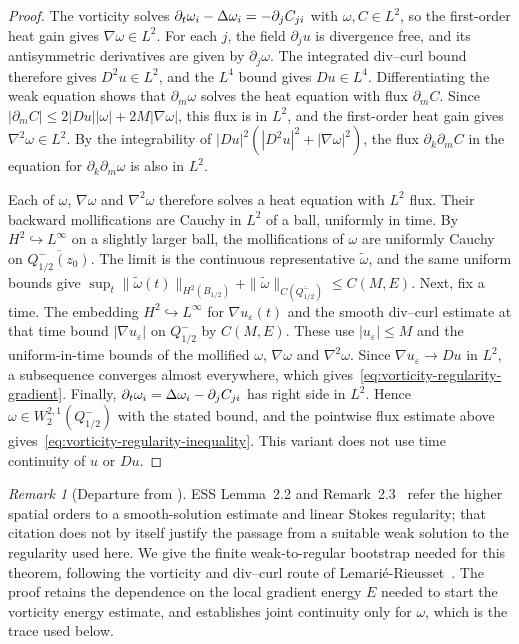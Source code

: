 \documentclass[11pt,letterpaper]{article}
\numberwithin{equation}{section}
\theoremstyle{plain}
\theoremstyle{definition}
\theoremstyle{remark}
\newtheorem{remark}[theorem]{Remark}
\begin{document}
\begin{proof}
The vorticity solves $\partial_t\omega_i-\Delta\omega_i=-\partial_jC_{ji}$ with $\omega,C\in L^2$, so the first-order heat gain gives $\nabla\omega\in L^2$. For each $j$, the field $\partial_ju$ is divergence free, and its antisymmetric derivatives are given by $\partial_j\omega$. The integrated div--curl bound therefore gives $D^2u\in L^2$, and the $L^4$ bound gives $Du\in L^4$. Differentiating the weak equation shows that $\partial_m\omega$ solves the heat equation with flux $\partial_mC$. Since $|\partial_mC|\le2|Du||\omega|+2M|\nabla\omega|$, this flux is in $L^2$, and the first-order heat gain gives $\nabla^2\omega\in L^2$. By the integrability of $|Du|^2(|D^2u|^2+|\nabla\omega|^2)$, the flux $\partial_k\partial_mC$ in the equation for $\partial_k\partial_m\omega$ is also in $L^2$.

Each of $\omega$, $\nabla\omega$ and $\nabla^2\omega$ therefore solves a heat equation with $L^2$ flux. Their backward mollifications are Cauchy in $L^2$ of a ball, uniformly in time. By $H^2\hookrightarrow L^\infty$ on a slightly larger ball, the mollifications of $\omega$ are uniformly Cauchy on $\overline{Q_{1/2}^-(z_0)}$. The limit is the continuous representative $\widetilde\omega$, and the same uniform bounds give $\sup_t\|\widetilde\omega(t)\|_{H^2(B_{1/2})}+\|\widetilde\omega\|_{C(\overline{Q_{1/2}^-})}\le C(M,E)$. Next, fix a time. The embedding $H^2\hookrightarrow L^\infty$ for $\nabla u_\varepsilon(t)$ and the smooth div--curl estimate at that time bound $|\nabla u_\varepsilon|$ on $Q_{1/2}^-$ by $C(M,E)$. These use $|u_\varepsilon|\le M$ and the uniform-in-time bounds of the mollified $\omega$, $\nabla\omega$ and $\nabla^2\omega$. Since $\nabla u_\varepsilon\to Du$ in $L^2$, a subsequence converges almost everywhere, which gives~\eqref{eq:vorticity-regularity-gradient}. Finally, $\partial_t\omega_i=\Delta\omega_i-\partial_jC_{ji}$ has right side in $L^2$. Hence $\omega\in W^{2,1}_2(Q_{1/2}^-)$ with the stated bound, and the pointwise flux estimate above gives~\eqref{eq:vorticity-regularity-inequality}. This variant does not use time continuity of $u$ or $Du$.
\end{proof}

\begin{remark}[Departure from \cite{ESS2003}]
ESS Lemma~2.2 and Remark~2.3~\cite[Lemma~2.2, Remark~2.3, pp.~216, 220--221]{ESS2003} refer the higher spatial orders to a smooth-solution estimate and linear Stokes regularity; that citation does not by itself justify the passage from a suitable weak solution to the regularity used here. We give the finite weak-to-regular bootstrap needed for this theorem, following the vorticity and div--curl route of Lemari\'e-Rieusset~\cite[Theorems~13.1--13.2, pp.~397--403]{LemarieRieusset2016}. The proof retains the dependence on the local gradient energy $E$ needed to start the vorticity energy estimate, and establishes joint continuity only for $\omega$, which is the trace used below.
\end{remark}
\end{document}
